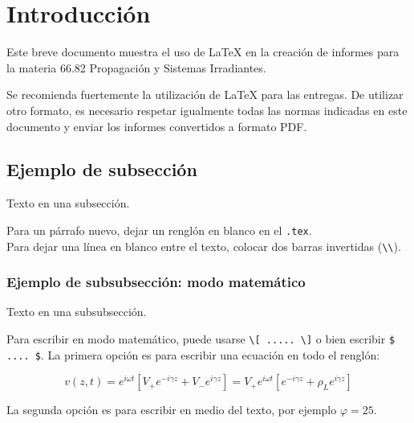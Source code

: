 \documentclass{article}
\date{Marzo de 2012}
\begin{document}
\headheight 0cm
\graphicspath{{./img/}}



\clearpage
\tableofcontents
\clearpage

\section{Introducción}

Este breve documento muestra el uso de \LaTeX{} en la creación de informes para la materia 66.82 Propagación y Sistemas Irradiantes.

Se recomienda fuertemente la utilización de \LaTeX{} para las entregas. De utilizar otro formato, es necesario respetar igualmente todas las normas indicadas en este documento y enviar los informes convertidos a formato PDF.

\subsection{Ejemplo de subsección}

Texto en una subsección.

Para un párrafo nuevo, dejar un renglón en blanco en el \texttt{.tex}.\\

Para dejar una línea en blanco entre el texto, colocar dos barras invertidas (\verb|\\|). %

\subsubsection{Ejemplo de subsubsección: modo matemático}

Texto en una subsubsección.

Para escribir en modo matemático, puede usarse \verb|\[ ..... \]| o bien escribir \verb|$ .... $|. La primera opción es para escribir una ecuación en todo el renglón:

\[
 v(z,t) = e^{i \omega t} [V_+ e^{-i \gamma z} + V_- e^{i \gamma z}] =
 V_+ e^{i \omega t}[ e^{-i \gamma z} + \rho_L e^{i \gamma z}]
\]

La segunda opción es para escribir en medio del texto, por ejemplo $\varphi = 25$.
\end{document}

